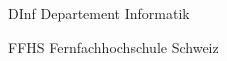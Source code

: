 \begin{abkuerzungen}[MUSTER] %
    \item[DInf] Departement Informatik
    \item[FFHS] Fernfachhochschule Schweiz
\end{abkuerzungen}